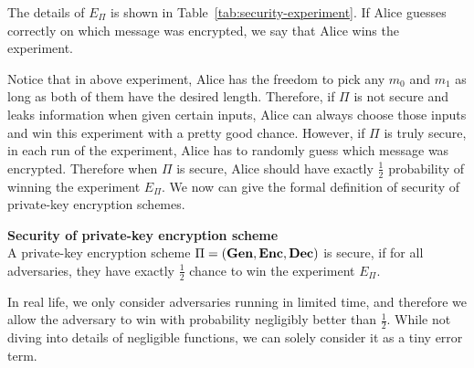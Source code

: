 The details of $E_{\Pi}$ is shown in Table~\ref{tab:security-experiment}. If Alice guesses correctly on which message was encrypted, we say that Alice wins the experiment.
\par Notice that in above experiment, Alice has the freedom to pick any $m_0$ and $m_1$ as long as both of them have the desired length. Therefore, if $\Pi$ is not secure and leaks information when given certain inputs, Alice can always choose those inputs and win this experiment with a pretty good chance. However, if $\Pi$ is truly secure, in each run of the experiment, Alice has to randomly guess which message was encrypted. Therefore when $\Pi$ is secure, Alice should have exactly $\frac{1}{2}$ probability of winning the experiment $E_{\Pi}$. We now can give the formal definition of security of private-key encryption schemes.
\begin{definition}\label{def:security} \textbf{Security of private-key encryption scheme} \\
    A private-key encryption scheme $\Pi = \normalfont (\textbf{Gen}, \textbf{Enc}, \textbf{Dec})$ is secure, if for all adversaries, they have exactly $\frac{1}{2}$ chance to win the experiment $E_{\Pi}$.
\end{definition}
\par In real life, we only consider adversaries running in limited time, and therefore we allow the adversary to win with probability negligibly better than $\frac{1}{2}$. While not diving into details of negligible functions, we can solely consider it as a tiny error term.

